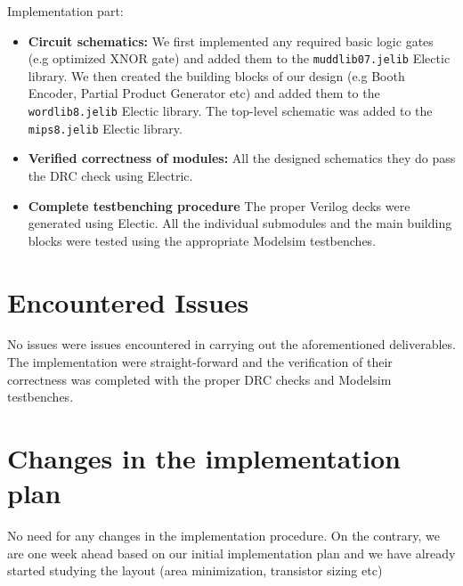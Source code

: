 \documentclass[conference]{IEEEtran}
\begin{document}
Implementation part:
\begin{itemize}
\item \textbf{Circuit schematics:}
We first implemented 
any required basic logic gates (e.g optimized 
XNOR gate) and added them to the
\texttt{muddlib07.jelib} Electic library.
We then created the building blocks of our design
(e.g Booth Encoder, Partial Product Generator etc)
and added them to the
\texttt{wordlib8.jelib} Electic library.
The top-level schematic was added to 
the \texttt{mips8.jelib} Electic library.


\item \textbf{Verified correctness of modules:}
All the designed schematics they do pass the 
DRC check using Electric.

\item \textbf{Complete testbenching procedure}
The proper Verilog decks were generated using
Electic. All the individual submodules and the
main building blocks were tested using the 
appropriate Modelsim testbenches.

\end{itemize}




\section{Encountered Issues}

No issues were issues encountered
in carrying out	the aforementioned 
deliverables. The implementation were
straight-forward and the verification
of their correctness was completed with
the proper DRC checks and Modelsim 
testbenches.

\section{Changes in the implementation plan}

No need for any changes in the implementation
procedure. On the contrary, we are one week ahead
based on our initial implementation plan and we
have already started studying the
layout (area minimization, transistor sizing etc)




\end{document}
